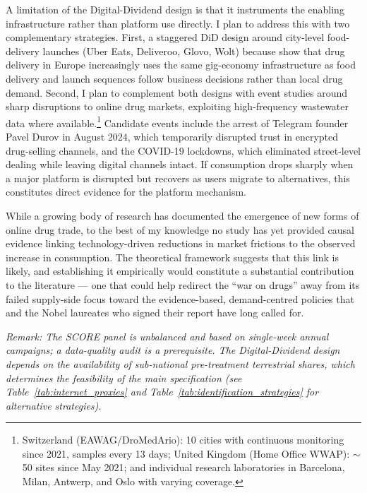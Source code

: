 \documentclass[12pt, a4paper]{article}
\begin{document}
A limitation of the Digital-Dividend design is that it instruments the enabling infrastructure rather than platform use directly. I plan to address this with two complementary strategies. First, a staggered DiD design around city-level food-delivery launches (Uber Eats, Deliveroo, Glovo, Wolt) because \citet{moyle_2019_drugsforsale} show that drug delivery in Europe increasingly uses the same gig-economy infrastructure as food delivery and launch sequences follow business decisions rather than local drug demand. Second, I plan to complement both designs with event studies around sharp disruptions to online drug markets, exploiting high-frequency wastewater data where available.\footnote{Switzerland (EAWAG/DroMedArio): 10 cities with continuous monitoring since 2021, samples every 13 days; United Kingdom (Home Office WWAP): $\sim$50 sites since May 2021; and individual research laboratories in Barcelona, Milan, Antwerp, and Oslo with varying coverage.} Candidate events include the arrest of Telegram founder Pavel Durov in August 2024, which temporarily disrupted trust in encrypted drug-selling channels, and the COVID-19 lockdowns, which eliminated street-level dealing while leaving digital channels intact. If consumption drops sharply when a major platform is disrupted but recovers as users migrate to alternatives, this constitutes direct evidence for the platform mechanism. 

While a growing body of research has documented the emergence of new forms of online drug trade, to the best of my knowledge no study has yet provided causal evidence linking technology-driven reductions in market frictions to the observed increase in consumption. The theoretical framework suggests that this link is likely, and establishing it empirically would constitute a substantial contribution to the literature --- one that could help redirect the ``war on drugs'' away from its failed supply-side focus toward the evidence-based, demand-centred policies that \citet{lse_2014} and the Nobel laureates who signed their report have long called for.


\medskip
\noindent \textit{Remark: The SCORE panel is unbalanced and based on single-week annual campaigns; a data-quality audit is a prerequisite. The Digital-Dividend design depends on the availability of sub-national pre-treatment terrestrial shares, which determines the feasibility of the main specification (see Table~\ref{tab:internet_proxies} and Table~\ref{tab:identification_strategies} for alternative strategies).}
\end{document}
